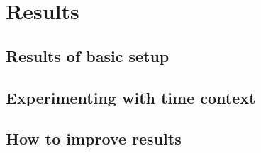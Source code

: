 \section{Results}
\label{sec:results}

\subsection{Results of basic setup}

\subsection{Experimenting with time context}

\subsection{How to improve results}
